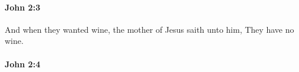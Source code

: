 		\paragraph{John 2:3} %
			\label{JOHN-2-3}

			And when they wanted wine, the mother of Jesus saith unto him, They have no wine.

			\begin{framed}
			\scriptsize
				\begin{compactdesc}
					\item[SBLG] 
				\end{compactdesc}
			\end{framed}

		\paragraph{John 2:4} %
			\label{JOHN-2-4}

